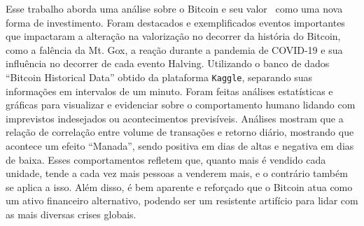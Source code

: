 Esse trabalho aborda uma análise sobre o Bitcoin e seu valor  como uma nova forma de investimento. Foram destacados e exemplificados eventos importantes que impactaram a alteração na valorização no decorrer da história do Bitcoin, como a falência da Mt. Gox, a reação durante a pandemia de COVID-19 e sua influência no decorrer de cada evento Halving. Utilizando o banco de dados “Bitcoin Historical Data” obtido da plataforma \texttt{Kaggle}, separando suas informações em intervalos de um minuto. Foram feitas análises estatísticas e gráficas para visualizar e evidenciar sobre o comportamento humano lidando com imprevistos indesejados ou acontecimentos previsíveis. Análises mostram que a relação de correlação entre volume de transações e retorno diário, mostrando que acontece um efeito “Manada”, sendo positiva em dias de altas e negativa em dias de baixa. Esses comportamentos refletem que, quanto mais é vendido cada unidade, tende a cada vez mais pessoas a venderem mais, e o contrário também se aplica a isso. Além disso, é bem aparente e reforçado que o Bitcoin atua como um ativo financeiro alternativo, podendo ser um resistente artifício para lidar com as mais diversas crises globais.  